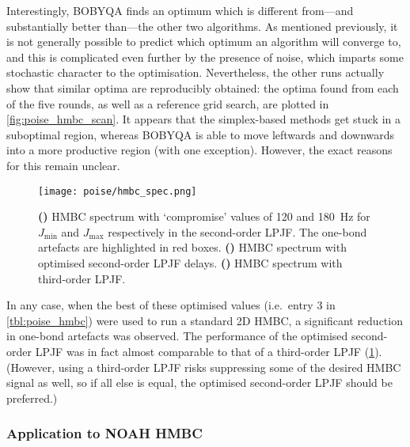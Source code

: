 Interestingly, BOBYQA finds an optimum which is different from---and substantially better than---the other two algorithms.
As mentioned previously, it is not generally possible to predict which optimum an algorithm will converge to, and this is complicated even further by the presence of noise, which imparts some stochastic character to the optimisation.
Nevertheless, the other runs actually show that similar optima are reproducibly obtained: the optima found from each of the five rounds, as well as a reference grid search, are plotted in \cref{fig:poise_hmbc_scan}.
It appears that the simplex-based methods get stuck in a suboptimal region, whereas BOBYQA is able to move leftwards and downwards into a more productive region (with one exception).
However, the exact reasons for this remain unclear.

\begin{figure}[htb]
    \centering
    \texttt{[image: poise/hmbc\_spec.png]}%
    {\label{fig:poise_hmbc_spec_unopt2}}%
    {\label{fig:poise_hmbc_spec_opt2}}%
    {\label{fig:poise_hmbc_spec_3}}%
    \caption[HMBC spectra before and after optimisation]{
        \textbf{()} HMBC spectrum with `compromise' values of 120 and \SI{180}{\Hz} for $J_\text{min}$ and $J_\text{max}$ respectively in the second-order LPJF.
        The one-bond artefacts are highlighted in red boxes.
        \textbf{()} HMBC spectrum with optimised second-order LPJF delays.
        \textbf{()} HMBC spectrum with third-order LPJF.
    }
    \label{fig:poise_hmbc_spec}
\end{figure}

In any case, when the best of these optimised values (i.e.\ entry 3 in \cref{tbl:poise_hmbc}) were used to run a standard 2D HMBC, a significant reduction in one-bond artefacts was observed.
The performance of the optimised second-order LPJF was in fact almost comparable to that of a third-order LPJF (\cref{fig:poise_hmbc_spec}).
(However, using a third-order LPJF risks suppressing some of the desired HMBC signal as well, so if all else is equal, the optimised second-order LPJF should be preferred.)


\subsubsection{Application to NOAH HMBC}

